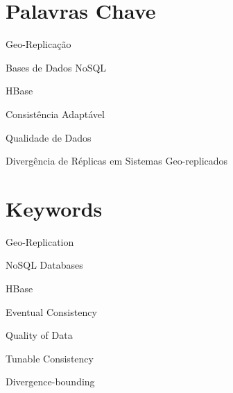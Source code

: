 \section*{Palavras Chave}
{\large %

\noindent Geo-Replica\c{c}\~ao

\noindent Bases de Dados NoSQL

\noindent HBase

\noindent Consist\^encia Adapt\'avel %

\noindent Qualidade de Dados

\noindent Divergência de Réplicas em Sistemas Geo-replicados
}

\section*{Keywords}

{\large %

\noindent Geo-Replication

\noindent NoSQL Databases

\noindent HBase

\noindent Eventual Consistency

\noindent Quality of Data

\noindent Tunable Consistency

\noindent Divergence-bounding

}

\vfill

\cleardoublepage



\pagestyle{plain}



\def\contentsname{Index}
\tableofcontents
\newpage

\listoffigures
\newpage

\listoftables

\cleardoublepage


